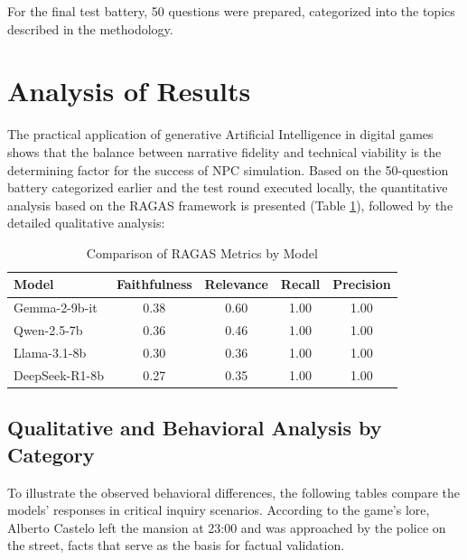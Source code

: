 \documentclass[12pt]{article}
\begin{document}
For the final test battery, 50 questions were prepared, categorized into the topics described in the methodology.

\section{Analysis of Results}

The practical application of generative Artificial Intelligence in digital games shows that the balance between narrative fidelity and technical viability is the determining factor for the success of NPC simulation. Based on the 50-question battery categorized earlier and the test round executed locally, the quantitative analysis based on the RAGAS framework is presented (Table \ref{tab:ragas_comparativo}), followed by the detailed qualitative analysis:

\begin{table}[h!]
\centering
\caption{Comparison of RAGAS Metrics by Model}
\vspace{0.2cm}
\label{tab:ragas_comparativo}
\renewcommand{\arraystretch}{1.3}
\begin{tabular}{|l|c|c|c|c|}
\hline
\textbf{Model} & \textbf{Faithfulness} & \textbf{Relevance} & \textbf{Recall} & \textbf{Precision} \\ \hline
Gemma-2-9b-it & 0.38 & 0.60 & 1.00 & 1.00 \\ \hline
Qwen-2.5-7b & 0.36 & 0.46 & 1.00 & 1.00 \\ \hline
Llama-3.1-8b & 0.30 & 0.36 & 1.00 & 1.00 \\ \hline
DeepSeek-R1-8b & 0.27 & 0.35 & 1.00 & 1.00 \\ \hline
\end{tabular}
\end{table}

\subsection{Qualitative and Behavioral Analysis by Category}

To illustrate the observed behavioral differences, the following tables compare the models' responses in critical inquiry scenarios. According to the game's lore, Alberto Castelo left the mansion at 23:00 and was approached by the police on the street, facts that serve as the basis for factual validation.
\end{document}

